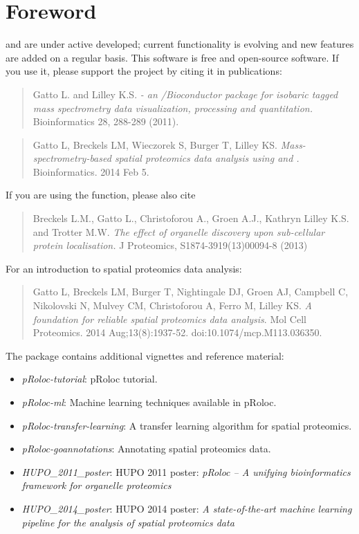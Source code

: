 \section*{Foreword}

 and  are under active developed;
current functionality is evolving and new features are added on a
regular basis.  This software is free and open-source software.  If
you use it, please support the project by citing it in publications:

\begin{quote}
  Gatto L. and Lilley K.S. \emph{ - an \R/Bioconductor
    package for isobaric tagged mass spectrometry data visualization,
    processing and quantitation.} Bioinformatics 28, 288-289 (2011).
\end{quote}

\begin{quote}
  Gatto L, Breckels LM, Wieczorek S, Burger T, Lilley KS.
  \textit{Mass-spectrometry-based spatial proteomics data analysis
    using  and .}
  Bioinformatics. 2014 Feb 5.
\end{quote}

If you are using the  function, please also cite

\begin{quote}
  Breckels L.M., Gatto L., Christoforou A., Groen A.J., Kathryn Lilley
  K.S. and Trotter M.W.  \emph{The effect of organelle discovery upon
    sub-cellular protein localisation.}  J Proteomics,
  S1874-3919(13)00094-8 (2013)
\end{quote}

For an introduction to spatial proteomics data analysis:

\begin{quote}
  Gatto L, Breckels LM, Burger T, Nightingale DJ, Groen AJ, Campbell
  C, Nikolovski N, Mulvey CM, Christoforou A, Ferro M, Lilley
  KS. \emph{A foundation for reliable spatial proteomics data
    analysis}. Mol Cell Proteomics. 2014
  Aug;13(8):1937-52. doi:10.1074/mcp.M113.036350.
\end{quote}

The  package contains additional vignettes and
reference material:

\begin{itemize}
\item \emph{pRoloc-tutorial}: pRoloc tutorial.
\item \emph{pRoloc-ml}: Machine learning techniques available in pRoloc.
\item \emph{pRoloc-transfer-learning}: A transfer learning algorithm
  for spatial proteomics.
\item \emph{pRoloc-goannotations}: Annotating spatial proteomics data.
\item \emph{HUPO\_2011\_poster}: HUPO 2011 poster: \textit{pRoloc -- A
    unifying bioinformatics framework for organelle proteomics}
\item \textit{HUPO\_2014\_poster}: HUPO 2014 poster: \textit{A
    state-of-the-art machine learning pipeline for the analysis of
    spatial proteomics data}
\end{itemize}